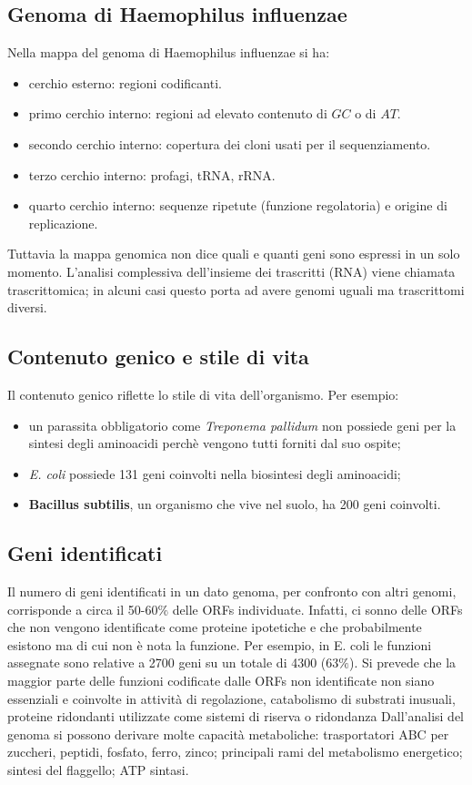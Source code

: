 	\subsection{Genoma di Haemophilus influenzae}
	Nella mappa del genoma di Haemophilus influenzae si ha:
	\begin{multicols}{2}
	\begin{itemize}
    		\item cerchio esterno: regioni codificanti.
    		\item primo cerchio interno: regioni ad elevato contenuto di $GC$ o di $AT$.
    		\item secondo cerchio interno: copertura dei cloni usati per il sequenziamento.
    		\item terzo cerchio interno: profagi, tRNA, rRNA.
    		\item quarto cerchio interno: sequenze ripetute (funzione regolatoria) e origine di replicazione.
	\end{itemize}
	\end{multicols}
	Tuttavia la mappa genomica non dice quali e quanti geni sono espressi in un solo momento. 
	L'analisi complessiva dell'insieme dei trascritti (RNA) viene chiamata trascrittomica; in alcuni casi questo porta ad avere genomi uguali ma trascrittomi diversi. 

	\subsection{Contenuto genico e stile di vita}
	Il contenuto genico riflette lo stile di vita dell'organismo. 
	Per esempio:
	\begin{itemize}
	    	\item un parassita obbligatorio come \textit{Treponema pallidum} non possiede geni per la sintesi degli aminoacidi perch\`e vengono tutti forniti dal suo ospite;
	    	\item \textit{E. coli} possiede 131 geni coinvolti nella biosintesi degli aminoacidi;
    		\item \textbf{Bacillus subtilis}, un organismo che vive nel suolo, ha 200 geni coinvolti.
	\end{itemize}

	\subsection{Geni identificati}
	Il numero di geni identificati in un dato genoma, per confronto con altri genomi, corrisponde a circa il 50-60$\%$ delle ORFs individuate.
	Infatti, ci sonno delle ORFs che non vengono identificate come proteine ipotetiche e che probabilmente esistono ma di cui non \`e nota la funzione. 
	Per esempio, in E. coli le funzioni assegnate sono relative a 2700 geni su un totale di 4300 (63$\%$). 
	Si prevede che la maggior parte delle funzioni codificate dalle ORFs non identificate non siano essenziali e coinvolte in attivit\`a di regolazione, catabolismo di substrati inusuali, proteine ridondanti utilizzate come sistemi di riserva o ridondanza
	Dall'analisi del genoma si possono derivare molte capacit\`a metaboliche: trasportatori ABC per zuccheri, peptidi, fosfato, ferro, zinco; principali rami del metabolismo energetico; sintesi del flaggello; ATP sintasi.


